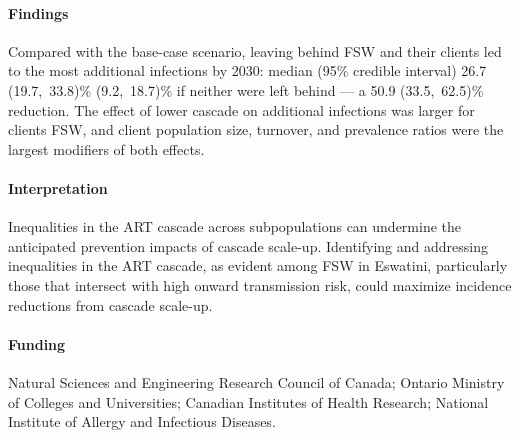 \paragraph{Findings}
Compared with the base-case scenario, leaving behind FSW and their clients
led to the most additional infections by 2030: median (95\% credible interval)
26.7 (19.7,~33.8)\%  (9.2,~18.7)\% if neither were left behind
--- a 50.9 (33.5,~62.5)\% reduction.
The effect of lower cascade on additional infections was larger for clients \vs FSW, and
client population size, turnover, and prevalence ratios were the largest modifiers of both effects.
\paragraph{Interpretation}
Inequalities in the ART cascade across subpopulations
can undermine the anticipated prevention impacts of cascade scale-up.
Identifying and addressing inequalities in the ART cascade, as evident among FSW in Eswatini, %
particularly those that intersect with high onward transmission risk,
could maximize incidence reductions from cascade scale-up.
\paragraph{Funding}
Natural Sciences and Engineering Research Council of Canada;
Ontario Ministry of Colleges and Universities;
Canadian Institutes of Health Research;
National Institute of Allergy and Infectious Diseases.
